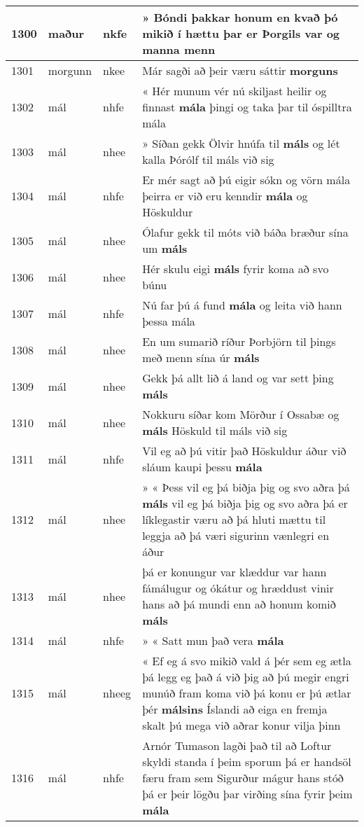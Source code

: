 \documentclass{article}
\begin{document}
\begin{longtable}{p{1cm}|p{1cm}|p{1cm}|p{13cm}}
\hline
1300&maður&nkfe&» Bóndi þakkar honum en kvað þó mikið í hættu þar er Þorgils var og \textbf{manna} menn\\
\hline
1301&morgunn&nkee&Már sagði að þeir væru sáttir \textbf{morguns} \\
\hline
1302&mál&nhfe&« Hér munum vér nú skiljast heilir og finnast \textbf{mála} þingi og taka þar til óspilltra mála\\
\hline
1303&mál&nhee&» Síðan gekk Ölvir hnúfa til \textbf{máls} og lét kalla Þórólf til máls við sig\\
\hline
1304&mál&nhfe&Er mér sagt að þú eigir sókn og vörn mála þeirra er við eru kenndir \textbf{mála} og Höskuldur\\
\hline
1305&mál&nhee&Ólafur gekk til móts við báða bræður sína um \textbf{máls} \\
\hline
1306&mál&nhee&Hér skulu eigi \textbf{máls} fyrir koma að svo búnu\\
\hline
1307&mál&nhfe&Nú far þú á fund \textbf{mála} og leita við hann þessa mála\\
\hline
1308&mál&nhee&En um sumarið ríður Þorbjörn til þings með menn sína úr \textbf{máls} \\
\hline
1309&mál&nhee&Gekk þá allt lið á land og var sett þing \textbf{máls} \\
\hline
1310&mál&nhee&Nokkuru síðar kom Mörður í Ossabæ og \textbf{máls} Höskuld til máls við sig\\
\hline
1311&mál&nhfe&Vil eg að þú vitir það Höskuldur áður við sláum kaupi þessu \textbf{mála} \\
\hline
1312&mál&nhee&» « Þess vil eg þá biðja þig og svo aðra þá \textbf{máls} vil eg þá biðja þig og svo aðra þá er líklegastir væru að þá hluti mættu til leggja að þá væri sigurinn vænlegri en áður\\
\hline
1313&mál&nhee&þá er konungur var klæddur var hann fámálugur og ókátur og hræddust vinir hans að þá mundi enn að honum komið \textbf{máls} \\
\hline
1314&mál&nhfe&» « Satt mun það vera \textbf{mála} \\
\hline
1315&mál&nheeg&« Ef eg á svo mikið vald á þér sem eg ætla þá legg eg það á við þig að þú megir engri munúð fram koma við þá konu er þú ætlar þér \textbf{málsins} Íslandi að eiga en fremja skalt þú mega við aðrar konur vilja þinn\\
\hline
1316&mál&nhfe&Arnór Tumason lagði það til að Loftur skyldi standa í þeim sporum þá er handsöl færu fram sem Sigurður mágur hans stóð þá er þeir lögðu þar virðing sína fyrir þeim \textbf{mála} \\

\end{longtable}
\end{document}

